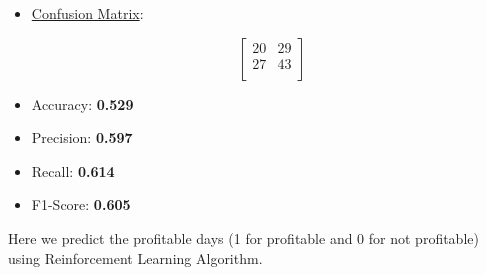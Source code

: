 \documentclass[12pt,a4paper]{report}
\begin{document}
\begin{itemize}
    \item \underline{Confusion Matrix}:
    \vspace{-0.5cm}
    \begin{flushleft}
    \[
    \begin{bmatrix}
        20 & 29 \\
        27 & 43 \\
    \end{bmatrix}
    \]
    \end{flushleft}
    \vspace{-0.5cm}
    \item Accuracy: \textbf{0.529}
    \item Precision: \textbf{0.597}
    \item Recall: \textbf{0.614}
    \item F1-Score: \textbf{0.605}
\end{itemize}

Here we predict the profitable days (1 for profitable and 0 for not profitable) using Reinforcement Learning Algorithm.
\end{document}
